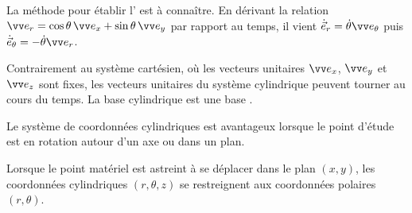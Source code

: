 \documentclass[12pt,fancy]{cours}
\begin{document}
\begin{demo}
  La méthode pour établir l’ est à connaître. En dérivant la relation $\er=\cos\theta\,\ex+\sin\theta\,\ey$ par rapport au temps, il vient $\dot{\vec{e}}_r =\dot{\theta}\et$ puis $\dot{\vec{e}}_\theta = -\dot{\theta}\er$. 
\end{demo}
Contrairement au système cartésien, où les vecteurs unitaires $\ex$, $\ey$ et $\ez$ sont fixes, les vecteurs unitaires du système cylindrique peuvent tourner au cours du temps. La base cylindrique est une base .

\begin{prop}
Le système de coordonnées cylindriques est avantageux lorsque le point d'étude  est en rotation autour d’un axe ou dans un plan.
\end{prop}

Lorsque le point matériel est astreint à se déplacer dans le plan $(x,y)$, les coordonnées cylindriques $(r,\theta,z)$ se restreignent aux coordonnées polaires $(r,\theta)$.




\end{document}
